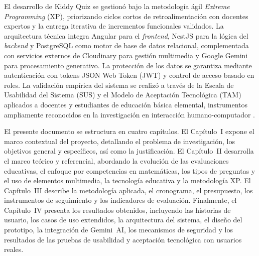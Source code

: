 El desarrollo de Kiddy Quiz se gestionó bajo la metodología ágil \textit{Extreme Programming} (XP), priorizando ciclos cortos de retroalimentación con docentes expertos y la entrega iterativa de incrementos funcionales validados. La arquitectura técnica integra Angular para el \textit{frontend}, NestJS para la lógica del \textit{backend} y PostgreSQL como motor de base de datos relacional, complementada con servicios externos de Cloudinary para gestión multimedia y Google Gemini para procesamiento generativo. La protección de los datos se garantiza mediante autenticación con tokens JSON Web Token (JWT) y control de acceso basado en roles. La validación empírica del sistema se realizó a través de la Escala de Usabilidad del Sistema (SUS) y el Modelo de Aceptación Tecnológica (TAM) aplicados a docentes y estudiantes de educación básica elemental, instrumentos ampliamente reconocidos en la investigación en interacción humano-computador \cite{brooke1996sus,davis1989tam}.

El presente documento se estructura en cuatro capítulos. El Capítulo~I expone el marco contextual del proyecto, detallando el problema de investigación, los objetivos general y específicos, así como la justificación. El Capítulo~II desarrolla el marco teórico y referencial, abordando la evolución de las evaluaciones educativas, el enfoque por competencias en matemáticas, los tipos de preguntas y el uso de elementos multimedia, la tecnología educativa y la metodología XP. El Capítulo~III describe la metodología aplicada, el cronograma, el presupuesto, los instrumentos de seguimiento y los indicadores de evaluación. Finalmente, el Capítulo~IV presenta los resultados obtenidos, incluyendo las historias de usuario, los casos de uso extendidos, la arquitectura del sistema, el diseño del prototipo, la integración de Gemini~AI, los mecanismos de seguridad y los resultados de las pruebas de usabilidad y aceptación tecnológica con usuarios reales.